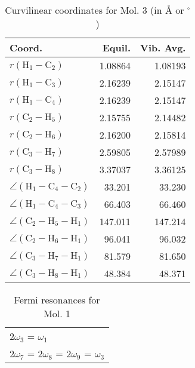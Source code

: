 \begin{table}
\centering
\caption{Curvilinear coordinates for Mol. 3 (in \AA{} or $^\circ$)}
\begin{tabular}{lrr}
       Coord.         &             Equil. &          Vib. Avg. \\
\hline
$r(\text{H}_{1} - \text{C}_{2})$ &            1.08864 &            1.08193 \\
$r(\text{H}_{1} - \text{C}_{3})$ &            2.16239 &            2.15147 \\
$r(\text{H}_{1} - \text{C}_{4})$ &            2.16239 &            2.15147 \\
$r(\text{C}_{2} - \text{H}_{5})$ &            2.15755 &            2.14482 \\
$r(\text{C}_{2} - \text{H}_{6})$ &            2.16200 &            2.15814 \\
$r(\text{C}_{3} - \text{H}_{7})$ &            2.59805 &            2.57989 \\
$r(\text{C}_{3} - \text{H}_{8})$ &            3.37037 &            3.36125 \\
$\angle(\text{H}_{1} - \text{C}_{4} - \text{C}_{2})$ &             33.201 &             33.230 \\
$\angle(\text{H}_{1} - \text{C}_{4} - \text{C}_{3})$ &             66.403 &             66.460 \\
$\angle(\text{C}_{2} - \text{H}_{5} - \text{H}_{1})$ &            147.011 &            147.214 \\
$\angle(\text{C}_{2} - \text{H}_{6} - \text{H}_{1})$ &             96.041 &             96.032 \\
$\angle(\text{C}_{3} - \text{H}_{7} - \text{H}_{1})$ &             81.579 &             81.650 \\
$\angle(\text{C}_{3} - \text{H}_{8} - \text{H}_{1})$ &             48.384 &             48.371 \\
\end{tabular}
\end{table}

\begin{table}
\centering
\caption{Fermi resonances for Mol. 1}
\begin{tabular}{l}
2$\omega_{3 }$ = $\omega_{1 }$ \\
2$\omega_{7 }$ = 2$\omega_{8 }$ = 2$\omega_{9 }$ = $\omega_{3 }$ \\
\end{tabular}
\end{table}


